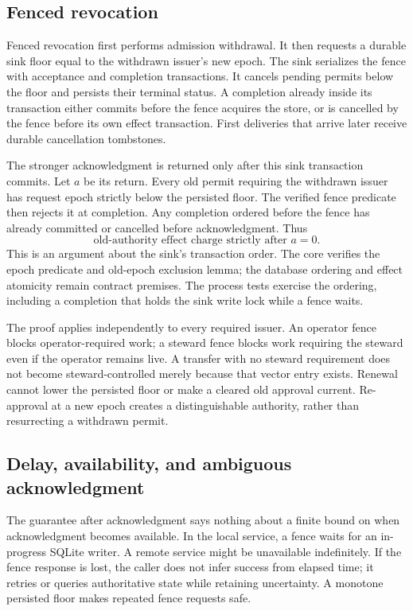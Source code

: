 \subsection{Fenced revocation}
Fenced revocation first performs admission withdrawal. It then requests a
durable sink floor equal to the withdrawn issuer's new epoch. The sink serializes
the fence with acceptance and completion transactions. It cancels pending
permits below the floor and persists their terminal status. A completion already
inside its transaction either commits before the fence acquires the store, or
is cancelled by the fence before its own effect transaction. First deliveries
that arrive later receive durable cancellation tombstones.

The stronger acknowledgment is returned only after this sink transaction commits.
Let $a$ be its return. Every old permit requiring the withdrawn issuer has
request epoch strictly below the persisted floor. The verified fence predicate
then rejects it at completion. Any completion ordered before the fence has
already committed or cancelled before acknowledgment. Thus
\begin{equation}
 \text{old-authority effect charge strictly after }a=0.
\label{eq:v2fencedzero}
\end{equation}
This is an argument about the sink's transaction order. The core verifies the
epoch predicate and old-epoch exclusion lemma; the database ordering and effect
atomicity remain contract premises. The process tests exercise the ordering,
including a completion that holds the sink write lock while a fence waits.

The proof applies independently to every required issuer. An operator fence
blocks operator-required work; a steward fence blocks work requiring the
steward even if the operator remains live. A transfer with no steward requirement
does not become steward-controlled merely because that vector entry exists.
Renewal cannot lower the persisted floor or make a cleared old approval current.
Re-approval at a new epoch creates a distinguishable authority, rather than
resurrecting a withdrawn permit.

\subsection{Delay, availability, and ambiguous acknowledgment}
The guarantee after acknowledgment says nothing about a finite bound on when
acknowledgment becomes available. In the local service, a fence waits for an
in-progress SQLite writer. A remote service might be unavailable indefinitely.
If the fence response is lost, the caller does not infer success from elapsed
time; it retries or queries authoritative state while retaining uncertainty.
A monotone persisted floor makes repeated fence requests safe.

